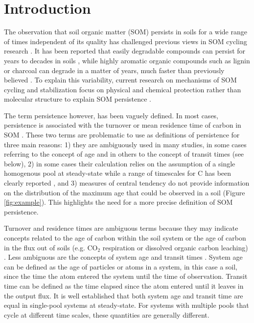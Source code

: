 \documentclass[draft,linenumbers]{agujournal}
\begin{document}
\section{Introduction}
The observation that soil organic matter (SOM) persists in soils for a wide range of times independent of its quality has challenged previous views in SOM cycling research \citep{Kleber2010, Schmidt2011, Dungait2012, Gleixner2013, Paul2016}. It has been reported that easily degradable compounds can persist for years to decades in soils \citep{Kiem2003, Kleber2010}, while highly aromatic organic compounds such as lignin or charcoal can degrade in a matter of years, much faster than previously believed \citep{Gleixner1999, Kleber2010, Heim2007, Lehmann2015}. %
To explain this variability, current research on mechanisms of SOM cycling and stabilization focus on physical and chemical protection rather than molecular structure to explain SOM persistence \citep{Schmidt2011, LehmannKleber}. 

The term persistence however, has been vaguely defined. In most cases, persistence is associated with the turnover or mean residence time of carbon in SOM \citep{Schmidt2011, Derrien2011, Lehmann2015}. These two terms are problematic to use as definitions of persistence for three main reasons: 1) they are ambiguously used in many studies, in some cases referring to the concept of age and in others to the concept of transit times (see below), 2) in some cases their calculation relies on the assumption of a single homogenous pool at steady-state while a range of timescales for C has been clearly reported \citep{Trumbore2000, Trumbore2009}, and 3) measures of central tendency do not provide information on the distribution of the maximum age that could be observed in a soil (Figure \ref{fig:example}). This highlights the need for a more precise definition of SOM persistence. %

Turnover and residence times are ambiguous terms because they may indicate concepts related to the age of carbon within the soil system or the age of carbon in the flux out of soils (e.g. CO$_2$ respiration or dissolved organic carbon leaching) \citep{Sierra2017}. Less ambiguous are the concepts of system age and transit times \citep{Bolin1973, Bruun2004, Derrien2011, Manzoni2009, Sierra2017}. System age can be defined as the age of particles or atoms in a system, in this case a soil, since the time the atom entered the system until the time of observation. Transit time can be defined as the time elapsed since the atom entered until it leaves in the output flux. It is well established that both system age and transit time are equal in single-pool systems at steady-state. For systems with multiple pools that cycle at different time scales, these quantities are generally different. 
 
\end{document}
